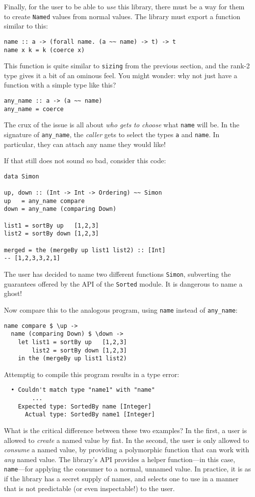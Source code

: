 \documentclass[format=sigplan, review=false, screen=true]{acmart}
\begin{document}
Finally, for the user to be able to \emph{use} this library, there must be a way for
them to create \texttt{Named} values from normal values. The library must export a
function similar to this:

\begin{verbatim}
name :: a -> (forall name. (a ~~ name) -> t) -> t
name x k = k (coerce x)
\end{verbatim}

This function is quite similar to \texttt{sizing} from the previous section, and the rank-2
type gives it a bit of an ominous feel. You might wonder: why not just have a function
with a simple type like this?

\begin{verbatim}
any_name :: a -> (a ~~ name)
any_name = coerce
\end{verbatim}

The crux of the issue is all about \emph{who gets to choose} what \texttt{name} will be.
In the signature of \texttt{any\_name}, the \emph{caller} gets to select the types \texttt{a}
and \texttt{name}. In particular, they can attach any name they would like!

If that still does not sound so bad, consider this code:

\begin{verbatim}
data Simon
  
up, down :: (Int -> Int -> Ordering) ~~ Simon
up   = any_name compare
down = any_name (comparing Down)

list1 = sortBy up   [1,2,3]
list2 = sortBy down [1,2,3]

merged = the (mergeBy up list1 list2) :: [Int]
-- [1,2,3,3,2,1]
\end{verbatim}
\noindent
The user has decided to name two different functions \texttt{Simon}, subverting the
guarantees offered by the API of the \texttt{Sorted} module. It is dangerous to
name a ghost!

Now compare this to the analogous program, using \texttt{name} instead of \texttt{any\_name}:
\begin{verbatim}
name compare $ \up ->
  name (comparing Down) $ \down ->
    let list1 = sortBy up   [1,2,3]
        list2 = sortBy down [1,2,3]
    in the (mergeBy up list1 list2)
\end{verbatim}
\noindent
Attemptig to compile this program results in a type error:

\begin{lstlisting}
  • Couldn't match type "name1" with "name"
        ...
    Expected type: SortedBy name [Integer]
      Actual type: SortedBy name1 [Integer]
\end{lstlisting}
\noindent
What is the critical difference between these two examples? In the first, a user is
allowed to \emph{create} a named value by fiat. In the second, the user is only allowed to \emph{consume} a named value, by
providing a polymorphic function that can work with \emph{any} named value. The library's API provides
a helper function---in this case, \texttt{name}---for applying the consumer to a normal, unnamed value.
In practice, it is as if the
library has a secret supply of names, and selects one to use in a manner that is not
predictable (or even inspectable!) to the user.
\end{document}
